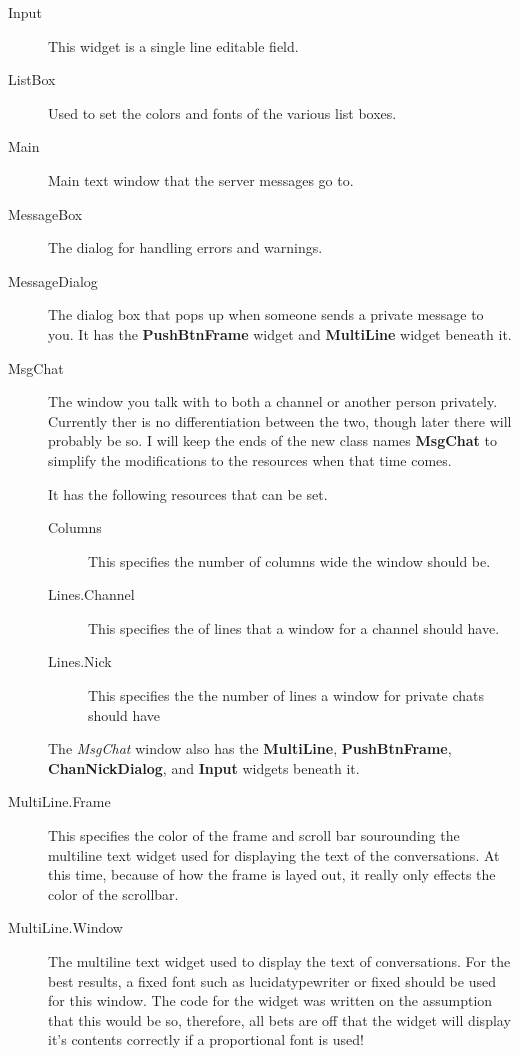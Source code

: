 \documentclass[titlepage]{article}
\begin{document}
\begin{description}
\begin{description}
\item[Input] This widget is a single line editable field.

\item[ListBox] Used to set the colors and fonts of the various list boxes.

\item[Main] Main text window that the server messages go to.

\item[MessageBox] The dialog for handling errors and warnings.

\item[MessageDialog] The dialog box that pops up when someone sends a
private message to you. It has the \textbf{PushBtnFrame} widget	and \textbf{MultiLine}
widget beneath it.

\item[MsgChat] The window you talk with to both a channel or another
person privately. Currently ther is no differentiation between the
two, though later there will probably be so. I will keep the ends of
the new class names \textbf{MsgChat} to simplify the modifications to
the resources when that time comes.

It has the following resources that can be set.

\begin{description}
\item[Columns] This specifies the number of columns wide the window should be.
\item[Lines.Channel] This specifies the of lines that a window for a channel
should have.
\item[Lines.Nick] This specifies the the number of lines a window for private
chats should have
\end{description}

The \textit{MsgChat} window also has the \textbf{MultiLine},
\textbf{PushBtnFrame}, \textbf{ChanNickDialog}, and \textbf{Input}
widgets beneath it.

\item[MultiLine.Frame] This specifies the color of the frame and
scroll bar sourounding the multiline text widget used for displaying
the text of the conversations. At this time, because of how the frame
is layed out, it really only effects the color of the scrollbar.

\item[MultiLine.Window] The multiline text widget used to display the
text of conversations. For the best results, a fixed font such as
lucidatypewriter or fixed should be used for this window. The code for
the widget was written on the assumption that this would be so,
therefore, all bets are off that the widget will display it's contents
correctly if a proportional font is used!


\end{description}
\end{description}
\end{document}
